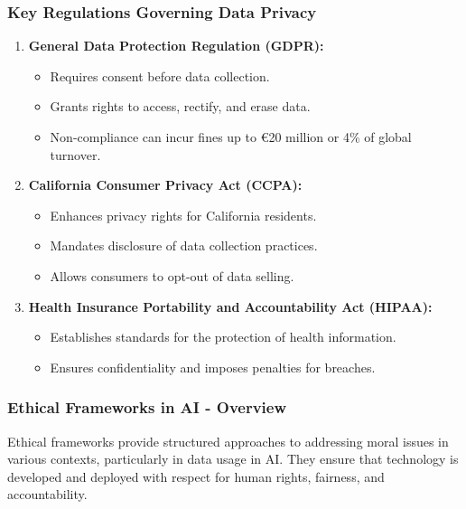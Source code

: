 \documentclass[aspectratio=169]{beamer}
\begin{document}
\begin{frame}[fragile]
    \frametitle{Key Regulations Governing Data Privacy}
    \begin{enumerate}
        \item \textbf{General Data Protection Regulation (GDPR):}
            \begin{itemize}
                \item Requires consent before data collection.
                \item Grants rights to access, rectify, and erase data.
                \item Non-compliance can incur fines up to €20 million or 4\% of global turnover.
            \end{itemize}
        \item \textbf{California Consumer Privacy Act (CCPA):}
            \begin{itemize}
                \item Enhances privacy rights for California residents.
                \item Mandates disclosure of data collection practices.
                \item Allows consumers to opt-out of data selling.
            \end{itemize}
        \item \textbf{Health Insurance Portability and Accountability Act (HIPAA):}
            \begin{itemize}
                \item Establishes standards for the protection of health information.
                \item Ensures confidentiality and imposes penalties for breaches.
            \end{itemize}
    \end{enumerate}
\end{frame}

\begin{frame}[fragile]
    \frametitle{Ethical Frameworks in AI - Overview}
    Ethical frameworks provide structured approaches to addressing moral issues in various contexts, particularly in data usage in AI. They ensure that technology is developed and deployed with respect for human rights, fairness, and accountability.
\end{frame}
\end{document}
